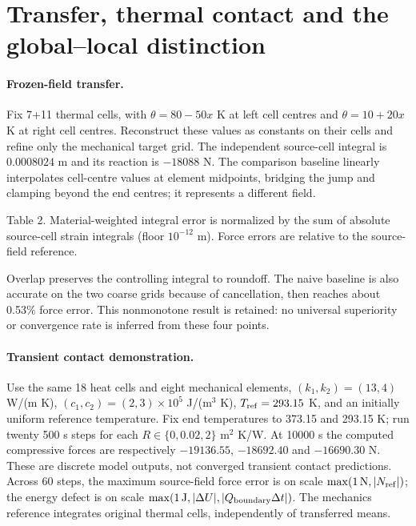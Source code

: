 \documentclass[10pt,a4paper]{article}
\begin{document}
\newpage
\section{Transfer, thermal contact and the global--local distinction}
\paragraph{Frozen-field transfer.}
Fix 7+11 thermal cells, with $\theta=80-50x$ K at left cell centres and $\theta=10+20x$ K at right cell centres. Reconstruct these values as constants on their cells and refine only the mechanical target grid. The independent source-cell integral is $0.0008024$ m and its reaction is $-18088$ N. The comparison baseline linearly interpolates cell-centre values at element midpoints, bridging the jump and clamping beyond the end centres; it represents a different field.

\noindent Table 2. Material-weighted integral error is normalized by the sum of absolute source-cell strain integrals (floor $10^{-12}$ m). Force errors are relative to the source-field reference.

Overlap preserves the controlling integral to roundoff. The naive baseline is also accurate on the two coarse grids because of cancellation, then reaches about 0.53\% force error. This nonmonotone result is retained: no universal superiority or convergence rate is inferred from these four points.

\paragraph{Transient contact demonstration.}
Use the same 18 heat cells and eight mechanical elements, $(k_1,k_2)=(13,4)$ W/(m K), $(c_1,c_2)=(2,3)\times10^5$ J/(m$^3$ K), $T_{\rm ref}=293.15$ K, and an initially uniform reference temperature. Fix end temperatures to 373.15 and 293.15 K; run twenty 500 s steps for each $R\in\{0,0.02,2\}$ m$^2$ K/W. At 10000 s the computed compressive forces are respectively $-19136.55$, $-18692.40$ and $-16690.30$ N. These are discrete model outputs, not converged transient contact predictions. Across 60 steps, the maximum source-field force error is \MaxSourceForceError{} on scale $\max(1\,{\rm N},|N_{\rm ref}|)$; the energy defect is \MaxEnergyError{} on scale $\max(1\,{\rm J},|\Delta U|,|Q_{\rm boundary}\Delta t|)$. The mechanics reference integrates original thermal cells, independently of transferred means.
\end{document}
